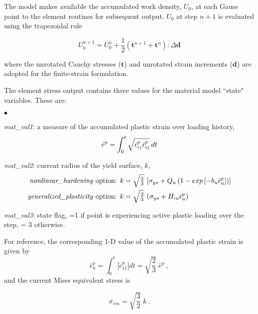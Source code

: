 \documentclass[11pt]{report}
\numberwithin{equation}{section}
\newcommand{\bmf } {\boldsymbol }
\newcommand{\squishlist}{
 \begin{list}{$\bullet$}
  { \setlength{\itemsep}{0pt}
     \setlength{\parsep}{3pt}
     \setlength{\topsep}{3pt}
     \setlength{\partopsep}{0pt}
     \setlength{\leftmargin}{1.5em}
     \setlength{\labelwidth}{1em}
     \setlength{\labelsep}{0.5em} } }
\newcommand{\squishend}{
  \end{list}  }
\begin{document}
The model makes available the accumulated work density, $U_0$, at 
each Gauss point to the element routines for subsequent
output. $U_0$ at step $n+1$ is evaluated using the trapezoidal rule 

\begin{equation}
U^{n+1}_0 = U^{n}_0 + \textstyle \frac{1}{2} 
\displaystyle  \left ( \bmf t^{n+1} + 
\bmf t^n \right )
: \Delta \bmf d
\end{equation}

\noindent where the unrotated Cauchy stresses ($\bmf t $) and unrotated 
strain increments ($\bmf d$) are adopted for the finite-strain
formulation.

The element stress output contains three values for the material model ``state" variables.
These are:
\squishlist
\item
\noindent \textit{mat\_val1}: a measure of the accumulated plastic strain over loading history,
\begin{equation}
\bar e^p = \int^t_0 \sqrt{\dot \epsilon^p_{ij}\dot \epsilon^p_{ij}   } \thinspace dt
\end{equation}
\item
\noindent \textit{mat\_val2}: current radius of the yield surface, $k$,
\begin{alignat}{1}
\text{\textit{nonlinear\_hardening} option:  } k &=\textstyle \sqrt{\frac {2}{3}}
 \displaystyle \thinspace 
 \left [ \sigma_{ys} + Q_u   \left( 1 - exp  
 \left [-b_u \bar \epsilon^p_u \right ] \right) \right ] \\
\text{\textit{generalized\_plasticity} option:  } k &= 
\textstyle \sqrt{\frac{2}{3}}  \displaystyle \thinspace 
 \left ( \sigma_{ys} + H_{iu} \bar\epsilon^p_u \right )
 \end{alignat}
\item
\noindent \textit{mat\_val3}: state flag, =1 if point is experiencing active 
plastic loading over the step, = 3 otherwise.
\squishend
For reference, the corresponding 1-D value of the accumulated plastic strain is given by
\begin{equation}
\bar \epsilon^p_u = \int^t_0 |\dot \epsilon^p_{11}| dt =
 \sqrt{\textstyle{\frac{2}{3}}}\; \bar e^p~,
\end{equation}
and the current Mises equivalent stress is

\begin{equation}
\sigma_{vm} = \sqrt{\textstyle{\frac{3}{2}}}\;k~.
\end{equation}
\end{document}

